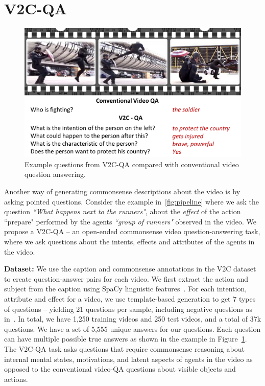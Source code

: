 \section{V2C-QA}
\begin{figure}[t]
    \centering
    \includegraphics[width=\linewidth]{v2c/fig/v2cqa.pdf}
    \caption{Example questions from V2C-QA compared with conventional video question answering.}
    \label{fig:v2cqa}
\end{figure}
Another way of generating commonsense descriptions about the video is by asking pointed questions.
Consider the example in~\ref{fig:pipeline} where we ask the question \textit{``What happens next to the runners"}, about the \textit{effect} of the action ``prepare" performed by the agents \textit{``group of runners"} observed in the video.
We propose a V2C-QA -- an open-ended commonsense video question-answering task, where we ask questions about the intents, effects and attributes of the agents in the video.

\noindent\textbf{Dataset:}
We use the caption and commonsense annotations in the V2C dataset to create question-answer pairs for each video.
We first extract the action and subject from the caption using SpaCy linguistic features~\cite{honnibal-johnson:2015:EMNLP}.
For each intention, attribute and effect for a video, we use template-based generation to get 7 types of questions -- yielding 21 questions per sample, including negative questions as in~\citet{gokhale2020vqa}.
In total, we have 1,250 training videos and 250 test videos, and a total of 37k questions.
We have a set of 5,555 unique answers for our questions.
Each question can have multiple possible true answers as shown in the example in Figure~\ref{fig:v2cqa}.
The V2C-QA task asks questions that require commonsense reasoning about internal mental states, motivations, and latent aspects of agents in the video as opposed to the conventional video-QA questions about visible objects and actions.



